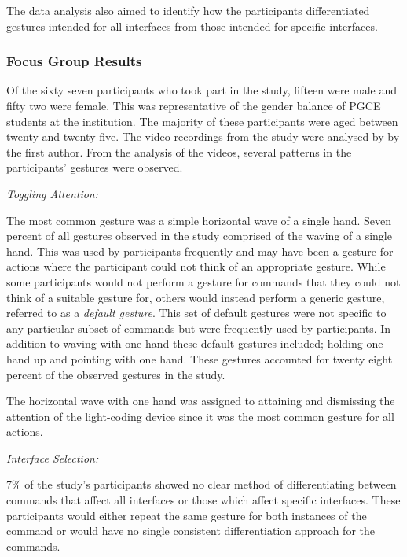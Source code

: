 \documentclass[link]{IWCOMP}
\begin{document}
The data analysis also aimed to identify how the participants differentiated gestures intended for all interfaces from those intended for specific interfaces.

\subsubsection{Focus Group Results}
\label{subsubsec:focusGroupResults}


Of the sixty seven participants who took part in the study, fifteen were male and fifty two were female.
This was representative of the gender balance of \ac{PGCE} students at the institution.
The majority of these participants were aged between twenty and twenty five.
The video recordings from the study were analysed by by the first author.
From the analysis of the videos, several patterns in the participants' gestures were observed.

\emph{Toggling Attention:}

The most common gesture was a simple horizontal wave of a single hand.
Seven percent of all gestures observed in the study comprised of the waving of a single hand.
This was used by participants frequently and may have been a gesture for actions where the participant could not think of an appropriate gesture. 
While some participants would not perform a gesture for commands that they could not think of a suitable gesture for, others would instead perform a generic gesture, referred to as a \textit{default gesture}.
This set of default gestures were not specific to any particular subset of commands but were frequently used by participants.
In addition to waving with one hand these default gestures included; holding one hand up and pointing with one hand.
These gestures accounted for twenty eight percent of the observed gestures in the study.

The horizontal wave with one hand was assigned to attaining and dismissing the attention of the light-coding device since it was the most common gesture for all actions.

\emph{Interface Selection:}

7\% of the study's participants showed no clear method of differentiating between commands that affect all interfaces or those which affect specific interfaces. 
These participants would either repeat the same gesture for both instances of the command or would have no single consistent differentiation approach for the commands. 
\end{document}

